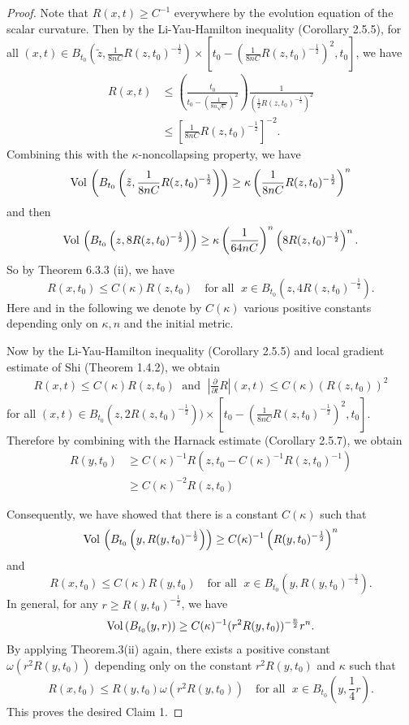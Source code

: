 \begin{proof}
Note that $R(x,t)\geqslant C^{-1}$ everywhere by the evolution
equation of the scalar curvature. Then by the Li-Yau-Hamilton
inequality (Corollary 2.5.5), for all $(x,t)\in
B_{t_{0}}(\tilde{z},\frac{1}{8nC}R(z,t_{0})^{-\frac{1}{2}})
\times[t_{0}-(\frac{1}{8nC}R(z,t_{0})^{-\frac{1}{2}})^{2},t_{0}]
$, we have
\begin{equation*}
\begin{split}
R(x,t)&  \leq \left(\frac{t_{0}}{t_{0}-\left(\frac{1}{8n\sqrt{C}}\right)^{2}}\right)
\frac{1}{\left(\frac{1}{2}R(z,t_{0})^{-\frac{1}{2}}\right)^{2}}\\
&  \leq \left[\frac{1}{8nC}R(z,t_{0})^{-\frac{1}{2}}\right]^{-2}.
\end{split}
\end{equation*}
Combining this with the $\kappa$-noncollapsing property, we have
$$
{\rm Vol}\,
\left(B_{t_{0}}\left(\tilde{z},\frac{1}{8nC}R(z,t_{0})^{-\frac{1}{2}}\right)\right)
\geq \kappa \left(\frac{1}{8nC}R(z,t_{0})^{-\frac{1}{2}}\right)^{n}
$$
and then
$$
{\rm Vol}\, \left(B_{t_{0}}\left(z,8R(z,t_{0})^{-\frac{1}{2}}\right)\right) \geq \kappa
\left(\frac{1}{64nC}\right)^{n}\left(8R(z,t_{0})^{-\frac{1}{2}}\right)^{n}.
$$
So by Theorem 6.3.3 (ii), we have
$$
R(x,t_{0})\leq C(\kappa)R(z,t_{0})\quad \text{for all }\; x\in
B_{t_{0}}\left(z,4R(z,t_{0})^{-\frac{1}{2}}\right).
$$
Here and in the following we denote by $C(\kappa)$ various
positive constants depending only on $\kappa,n$ and the initial
metric.

Now by the Li-Yau-Hamilton inequality (Corollary 2.5.5) and local
gradient estimate of Shi (Theorem 1.4.2), we obtain
\begin{align*}
R(x,t)\leq C(\kappa)R(z,t_{0})\; \text{ and }\;
\left|\frac{\partial}{\partial t}R\right|(x,t) \leq
C(\kappa)(R(z,t_{0}))^{2}
\end{align*}
for all $ (x,t)\in
B_{t_{0}}(z,2R(z,t_{0})^{-\frac{1}{2}}))\times[t_{0}-
(\frac{1}{8nC}R(z,t_{0})^{-\frac{1}{2}})^{2},t_{0}]$. Therefore by
combining with the Harnack estimate (Corollary 2.5.7), we obtain
\begin{align*}
R(y,t_{0})&  \geq C(\kappa)^{-1}R(z,t_{0}-C(\kappa)^{-1}R(z,t_{0})^{-1})\\
&  \geq C(\kappa)^{-2} R(z,t_{0})
\end{align*}

Consequently, we have showed that there is a constant $C(\kappa)$
such that
$$
{\rm Vol}\, \left(B_{t_{0}}\left(y,R(y,t_{0})^{-\frac{1}{2}}\right)\right) \geq
C(\kappa)^{-1}\left(R(y,t_{0})^{-\frac{1}{2}}\right)^{n}
$$
and
$$
R(x,t_{0})\leq C(\kappa)R(y,t_{0}) \quad \text{for all }\; x\in
B_{t_{0}}\left(y,R(y,t_{0})^{-\frac{1}{2}}\right).
$$
In general, for any $r\geq R(y,t_{0})^{-\frac{1}{2}}$, we have
$$
{\rm Vol}\, (B_{t_{0}}(y,r)) \geq
C(\kappa)^{-1}(r^{2}R(y,t_{0}))^{-\frac{n}{2}}r^{n}.
$$
By\; applying\; Theorem.3(ii)\; again,\; there\; exists\;
a\; positive\; constant $\omega(r^{2}R(y,t_{0}))$ depending only
on the constant $r^{2}R(y,t_{0})$ and $\kappa$ such that
$$
R(x,t_{0})\leq R(y,t_{0})\omega(r^{2}R(y,t_{0}))\quad \mbox{for
all }\;  x\in B_{t_{0}}\left(y,\frac{1}{4}r\right).
$$
This proves the desired Claim 1.


\end{proof}
